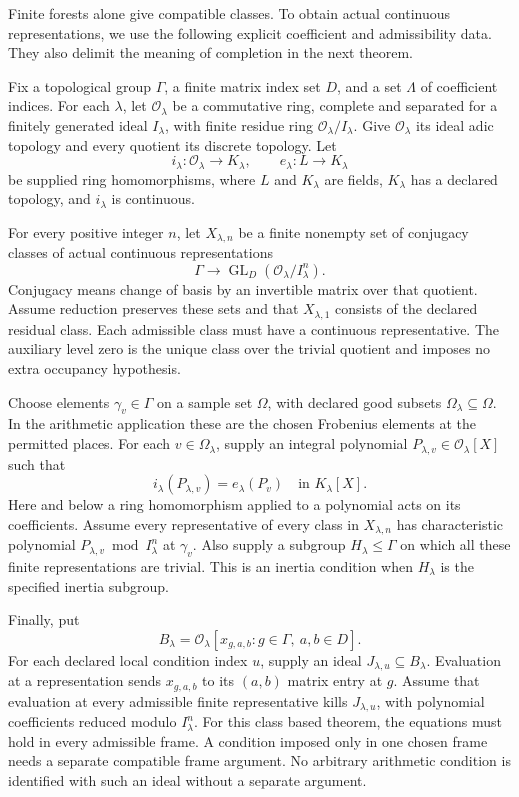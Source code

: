 \documentclass[11pt]{amsart}
\theoremstyle{definition}
\theoremstyle{remark}
\newcommand{\OO}{\mathcal O}
\newcommand{\GL}{\operatorname{GL}}
\begin{document}
Finite forests alone give compatible classes. To obtain actual continuous representations, we use the following explicit coefficient and admissibility data. They also delimit the meaning of completion in the next theorem.

Fix a topological group \(\Gamma\), a finite matrix index set \(D\), and a set \(\Lambda\) of coefficient indices. For each \(\lambda\), let \(\OO_\lambda\) be a commutative ring, complete and separated for a finitely generated ideal \(I_\lambda\), with finite residue ring \(\OO_\lambda/I_\lambda\). Give \(\OO_\lambda\) its ideal adic topology and every quotient its discrete topology. Let
\[
i_\lambda:\OO_\lambda\longrightarrow K_\lambda,
\qquad e_\lambda:L\longrightarrow K_\lambda
\]
be supplied ring homomorphisms, where \(L\) and \(K_\lambda\) are fields, \(K_\lambda\) has a declared topology, and \(i_\lambda\) is continuous.

For every positive integer \(n\), let \(X_{\lambda,n}\) be a finite nonempty set of conjugacy classes of actual continuous representations
\[
\Gamma\longrightarrow\GL_D(\OO_\lambda/I_\lambda^n).
\]
Conjugacy means change of basis by an invertible matrix over that quotient. Assume reduction preserves these sets and that \(X_{\lambda,1}\) consists of the declared residual class. Each admissible class must have a continuous representative. The auxiliary level zero is the unique class over the trivial quotient and imposes no extra occupancy hypothesis.

Choose elements \(\gamma_v\in\Gamma\) on a sample set \(\Omega\), with declared good subsets \(\Omega_\lambda\subseteq\Omega\). In the arithmetic application these are the chosen Frobenius elements at the permitted places. For each \(v\in\Omega_\lambda\), supply an integral polynomial \(P_{\lambda,v}\in\OO_\lambda[X]\) such that
\[
i_\lambda(P_{\lambda,v})=e_\lambda(P_v)\quad\text{in }K_\lambda[X].
\]
Here and below a ring homomorphism applied to a polynomial acts on its coefficients. Assume every representative of every class in \(X_{\lambda,n}\) has characteristic polynomial \(P_{\lambda,v}\bmod I_\lambda^n\) at \(\gamma_v\). Also supply a subgroup \(H_\lambda\leq\Gamma\) on which all these finite representations are trivial. This is an inertia condition when \(H_\lambda\) is the specified inertia subgroup.

Finally, put
\[
B_\lambda=\OO_\lambda[x_{g,a,b}:g\in\Gamma,\ a,b\in D].
\]
For each declared local condition index \(u\), supply an ideal \(J_{\lambda,u}\subseteq B_\lambda\). Evaluation at a representation sends \(x_{g,a,b}\) to its \((a,b)\) matrix entry at \(g\). Assume that evaluation at every admissible finite representative kills \(J_{\lambda,u}\), with polynomial coefficients reduced modulo \(I_\lambda^n\). For this class based theorem, the equations must hold in every admissible frame. A condition imposed only in one chosen frame needs a separate compatible frame argument. No arbitrary arithmetic condition is identified with such an ideal without a separate argument.
\end{document}
